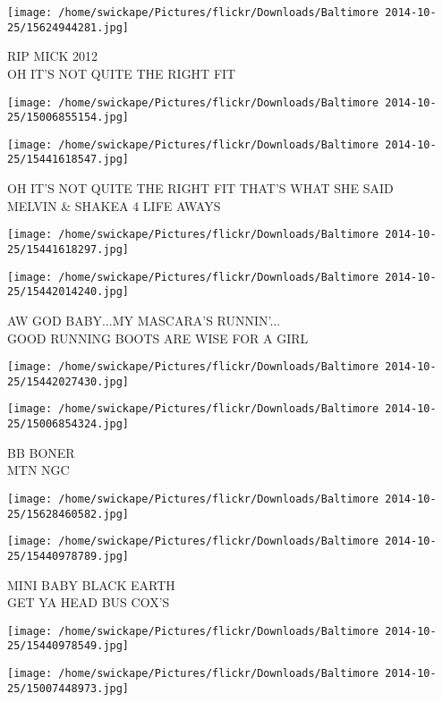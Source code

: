 \documentclass[10pt,letterpaper]{article}
\begin{document}
\vspace{0.25in}
\texttt{[image: /home/swickape/Pictures/flickr/Downloads/Baltimore 2014-10-25/15624944281.jpg]}

RIP MICK 2012\\
OH IT'S NOT QUITE THE RIGHT FIT
\pagebreak

\texttt{[image: /home/swickape/Pictures/flickr/Downloads/Baltimore 2014-10-25/15006855154.jpg]}

\vspace{0.25in}
\texttt{[image: /home/swickape/Pictures/flickr/Downloads/Baltimore 2014-10-25/15441618547.jpg]}

OH IT'S NOT QUITE THE RIGHT FIT THAT'S WHAT SHE SAID\\
MELVIN \& SHAKEA 4 LIFE AWAYS
\pagebreak

\texttt{[image: /home/swickape/Pictures/flickr/Downloads/Baltimore 2014-10-25/15441618297.jpg]}

\vspace{0.25in}
\texttt{[image: /home/swickape/Pictures/flickr/Downloads/Baltimore 2014-10-25/15442014240.jpg]}

AW GOD BABY...MY MASCARA'S RUNNIN'...\\
GOOD RUNNING BOOTS ARE WISE FOR A GIRL
\pagebreak

\texttt{[image: /home/swickape/Pictures/flickr/Downloads/Baltimore 2014-10-25/15442027430.jpg]}

\vspace{0.25in}
\texttt{[image: /home/swickape/Pictures/flickr/Downloads/Baltimore 2014-10-25/15006854324.jpg]}

BB BONER\\
MTN NGC
\pagebreak

\texttt{[image: /home/swickape/Pictures/flickr/Downloads/Baltimore 2014-10-25/15628460582.jpg]}

\vspace{0.25in}
\texttt{[image: /home/swickape/Pictures/flickr/Downloads/Baltimore 2014-10-25/15440978789.jpg]}

MINI BABY BLACK EARTH\\
GET YA HEAD BUS COX'S
\pagebreak

\texttt{[image: /home/swickape/Pictures/flickr/Downloads/Baltimore 2014-10-25/15440978549.jpg]}

\vspace{0.25in}
\texttt{[image: /home/swickape/Pictures/flickr/Downloads/Baltimore 2014-10-25/15007448973.jpg]}
\end{document}
